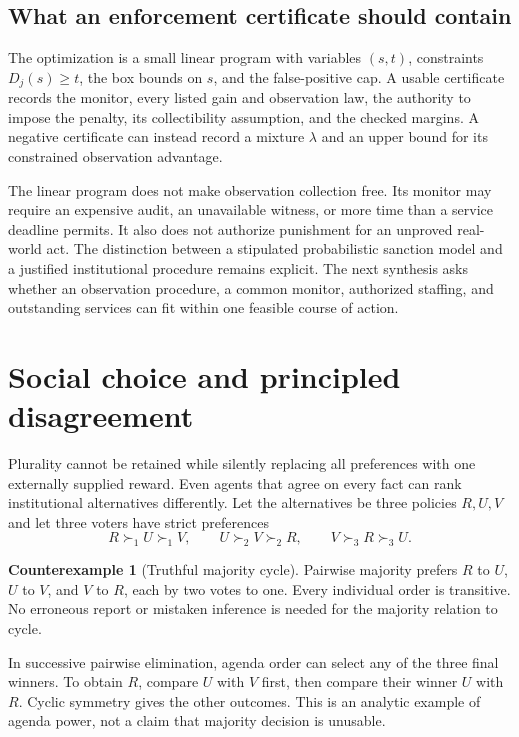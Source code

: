\documentclass[11pt,letterpaper]{article}
\theoremstyle{plain}
\theoremstyle{definition}
\newtheorem{counterexample}[proposition]{Counterexample}
\theoremstyle{remark}
\begin{document}
\subsection{What an enforcement certificate should contain}
The optimization is a small linear program with variables $(s,t)$, constraints $D_j(s)\geq t$, the box bounds on $s$, and the false-positive cap. A usable certificate records the monitor, every listed gain and observation law, the authority to impose the penalty, its collectibility assumption, and the checked margins. A negative certificate can instead record a mixture $\lambda$ and an upper bound for its constrained observation advantage.

The linear program does not make observation collection free. Its monitor may require an expensive audit, an unavailable witness, or more time than a service deadline permits. It also does not authorize punishment for an unproved real-world act. The distinction between a stipulated probabilistic sanction model and a justified institutional procedure remains explicit. The next synthesis asks whether an observation procedure, a common monitor, authorized staffing, and outstanding services can fit within one feasible course of action.
\FloatBarrier

\section{Social choice and principled disagreement}\label{sec:choice}
Plurality cannot be retained while silently replacing all preferences with one externally supplied reward. Even agents that agree on every fact can rank institutional alternatives differently. Let the alternatives be three policies $R,U,V$ and let three voters have strict preferences
\[
R\succ_1 U\succ_1 V,\qquad
U\succ_2 V\succ_2 R,\qquad
V\succ_3 R\succ_3 U.
\]

\begin{counterexample}[Truthful majority cycle]\label{ex:majority}
Pairwise majority prefers $R$ to $U$, $U$ to $V$, and $V$ to $R$, each by two votes to one. Every individual order is transitive. No erroneous report or mistaken inference is needed for the majority relation to cycle.
\end{counterexample}

In successive pairwise elimination, agenda order can select any of the three final winners. To obtain $R$, compare $U$ with $V$ first, then compare their winner $U$ with $R$. Cyclic symmetry gives the other outcomes. This is an analytic example of agenda power, not a claim that majority decision is unusable.
\end{document}
